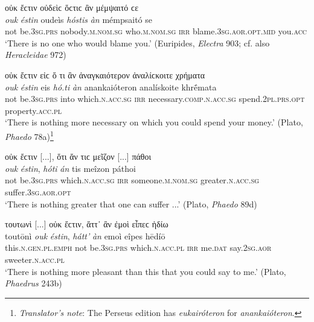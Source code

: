 \begin{exe}
\ex οὐκ ἔϲτιν οὐδεὶϲ ὅϲτιϲ ἂν μέμψαιτό ϲε\\
\gll \emph{ouk} \emph{éstin} oudeìs \emph{hóstis} \emph{àn} mémpsaitó se\\
not be.\textsc{3sg.prs} nobody.\textsc{m.nom.sg} who.\textsc{m.nom.sg} \textsc{irr} blame.\textsc{3sg.aor.opt.mid} you.\textsc{acc}\\
\trans `There is no one who would blame you.' (Euripides, \textit{Electra} 903; cf. also \textit{Heracleidae} 972)
\label{relan2}
\end{exe}

\begin{exe}
\ex οὐκ ἔϲτιν εἰϲ ὅ τι ἂν ἀναγκαιότερον ἀναλίϲκοιτε χρήματα\\
\gll \emph{ouk} \emph{éstin} eis \emph{hó.ti} \emph{àn} anankaióteron analískoite khrḗmata\\
not be.\textsc{3sg.prs} into which.\textsc{n.acc.sg} \textsc{irr} necessary.\textsc{comp.n.acc.sg} spend.\textsc{2pl.prs.opt} property.\textsc{acc.pl}\\
\trans `There is nothing more necessary on which you could spend your money.' (Plato, \textit{Phaedo} 78a)\footnote{\emph{Translator's note}: The Perseus edition has \textit{eukairóteron} for \textit{anankaióteron}.}
\label{relan3}
\end{exe}

\begin{exe}
\ex οὐκ ἔϲτιν {[}...{]}, ὅτι ἄν τιϲ μεῖζον {[}...{]} πάθοι\\
\gll \emph{ouk} \emph{éstin}, \emph{hóti} \emph{án} tis meîzon páthoi\\
not be.\textsc{3sg.prs} which.\textsc{n.acc.sg} \textsc{irr} someone.\textsc{m.nom.sg} greater.\textsc{n.acc.sg} suffer.\textsc{3sg.aor.opt}\\
\trans `There is nothing greater that one can suffer ...' (Plato, \textit{Phaedo} 89d)
\label{relan4}
\end{exe}

\begin{exe}
\ex τουτωνὶ {[}...{]} οὐκ ἔϲτιν, ἅττ᾽ ἂν ἐμοὶ εἶπεϲ ἡδίω\\
\gll toutōnì \emph{ouk} \emph{éstin}, \emph{hátt'} \emph{àn} emoì eîpes hēdíō\\
this.\textsc{n.gen.pl.emph} not be.\textsc{3sg.prs} which.\textsc{n.acc.pl} \textsc{irr} me.\textsc{dat} say.\textsc{2sg.aor} sweeter.\textsc{n.acc.pl}\\
\trans `There is nothing more pleasant than this that you could say to me.' (Plato, \textit{Phaedrus} 243b)
\label{relan5}
\end{exe}

